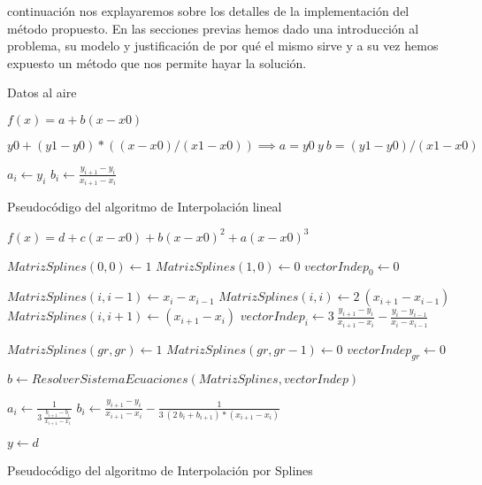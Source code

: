 \par {} continuaci\'on nos explayaremos sobre los detalles de la
implementaci\'on del m\'etodo propuesto. En las secciones previas hemos dado una
introducci\'on al problema, su modelo y justificaci\'on de por qué el mismo sirve
y a su vez hemos expuesto un m\'etodo que nos permite hayar la soluci\'on.

Datos al aire

$f(x) = a + b (x - x0)$

$y0 + (y1-y0) * ( (x - x0) / (x1 - x0)) \implies a = y0 \ y \ b = (y1-y0)/(x1-x0)$

\begin{algorithm}
    
    {		
		$a_i \gets y_i$\;
		$b_i \gets \frac{y_{i+1} - y_{i} }{x_{i+1} - x_{i}}$\;
	}
    \caption{Pseudoc\'odigo del algoritmo de Interpolaci\'on lineal}
    \label{alg:int_lineal}
\end{algorithm}

$f(x) = d + c ( x - x0 ) + b ( x - x0)^2 + a ( x - x0)^3$

\begin{algorithm}
    
	$MatrizSplines(0,0) \gets  1$\;
	$MatrizSplines(1,0) \gets  0$\;
	$vectorIndep_0 \gets 0$\;    
    
    {		
		$MatrizSplines(i,i-1) \gets x_i - x_{i-1}$\;
		$MatrizSplines(i,i) \gets 2 \ (x_{i+1} - x_{i-1})$\;
		$MatrizSplines(i,i+1) \gets (x_{i+1} - x_i)$\;
		$vectorIndep_i \gets 3 \  \frac{y_{i+1} - y_i }{x_{i+1}- x_{i}} - \frac{y_i - y_{i-1}}{ x_i -x_{i-1}}$\;
	}    
	
	$MatrizSplines(gr,gr) \gets  1$\;
	$MatrizSplines(gr,gr-1) \gets  0$\;
	$vectorIndep_{gr} \gets 0$\; 
	
	$b \gets ResolverSistemaEcuaciones(MatrizSplines,vectorIndep)$\;
	
	{
		$a_i \gets \frac{1}{3 \ \frac{b_{i+1} - b_{i}}{x_{i+1} - x_i}}$\;
		$b_i \gets \frac{y_{i+1}- y_i}{x_{i+1}- x_i} - \frac{1}{3 \ (2 \ b_i + b_{i+1}) * (x_{i+1} - x_{i})}$\;
	}    
	
	$y \gets d$	
	
    \caption{Pseudoc\'odigo del algoritmo de Interpolaci\'on por Splines}
    \label{alg:int_splines}
\end{algorithm}






